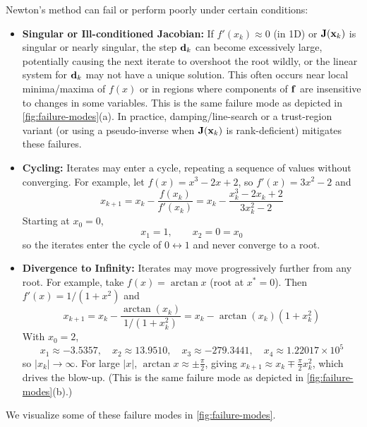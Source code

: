 Newton's method can fail or perform poorly under certain conditions:
\begin{itemize}
    \item \textbf{Singular or Ill-conditioned Jacobian:} If $f'(x_k) \approx 0$ (in 1D) or $\mathbf{J}(\mathbf{x}_k)$ is singular or nearly singular, the step $\mathbf{d}_k$ can become excessively large, potentially causing the next iterate to overshoot the root wildly, or the linear system for $\mathbf{d}_k$ may not have a unique solution. This often occurs near local minima/maxima of $f(x)$ or in regions where components of $\mathbf{f}$ are insensitive to changes in some variables. This is the same failure mode as depicted in \autoref{fig:failure-modes}(a). In practice, damping/line-search or a trust-region variant (or using a pseudo-inverse when $\mathbf{J}(\mathbf{x}_k)$ is rank-deficient) mitigates these failures.

    \item \textbf{Cycling:} Iterates may enter a cycle, repeating a sequence of values without converging. For example, let $f(x)=x^3-2x+2$, so $f'(x)=3x^2-2$ and
    \[
    x_{k+1} = x_k-\frac{f(x_k)}{f'(x_k)} = x_k-\frac{x_k^3-2x_k+2}{3x_k^2-2}
    \]
    Starting at $x_0=0$,
    \[
    x_1=1,\qquad x_2 = 0 = x_0
    \]
    so the iterates enter the cycle of $0 \leftrightarrow 1$ and never converge to a root.
    
    \item \textbf{Divergence to Infinity:} Iterates may move progressively further from any root. For example, take $f(x)=\arctan x$ (root at $x^*=0$). Then $f'(x)=1/(1+x^2)$ and
    \[
    x_{k+1} = x_k - \frac{\arctan(x_k)}{1/(1+x_k^2)} = x_k - \arctan(x_k)(1+x_k^2)
    \]
    With $x_0=2$,
    \[
    x_1\approx -3.5357,\quad x_2\approx 13.9510,\quad x_3\approx -279.3441,\quad x_4\approx 1.22017\times 10^{5}
    \]
    so $|x_k|\to\infty$. For large $|x|$, $\arctan x\approx \pm\frac{\pi}{2}$, giving $x_{k+1}\approx x_k\mp\frac{\pi}{2}x_k^2$, which drives the blow-up. (This is the same failure mode as depicted in \autoref{fig:failure-modes}(b).)
\end{itemize}
We visualize some of these failure modes in \autoref{fig:failure-modes}.

